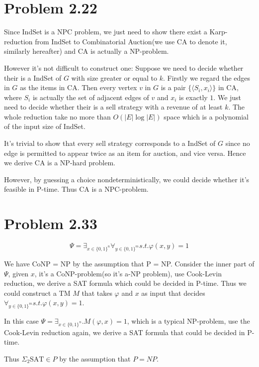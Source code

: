 \documentclass[paper=a4, fontsize=11pt]{scrartcl} %
\numberwithin{equation}{section} %
\numberwithin{figure}{section} %
\numberwithin{table}{section} %
\begin{document}
\section*{Problem 2.22}
Since IndSet is a NPC problem, we just need to show there exist a Karp-reduction from IndSet to Combinatorial Auction(we use CA to denote it, similarly hereafter) and CA is actually a NP-problem.

However it's not difficult to construct one: Suppose we need to decide whether their is a IndSet of $G$ with size greater or equal to $k$. Firstly we regard the edges in $G$ as the items in CA. Then every vertex $v$ in $G$ is a pair $\{\langle S_i, x_i\rangle\}$ in CA, where $S_i$ is actually the set of adjacent edges of $v$ and $x_i$ is exactly $1$. We just need to decide whether their is a sell strategy with a revenue of at least $k$. The whole reduction take no more than $O(|E|\log|E|)$ space which is a polynomial of the input size of IndSet. 

It's trivial to show that every sell strategy corresponds to a IndSet of $G$ since no edge is permitted to appear twice as an item for auction, and vice versa. Hence we derive CA is a NP-hard problem. 

However, by guessing a choice nondeterministically, we could decide whether it's feasible in P-time. Thus CA is a NPC-problem.
\section*{Problem 2.33}
$$\Psi = \exists_{x\in\{0,1\}^n} \forall_{y\in\{0,1\}^m} s.t. \varphi(x, y) = 1$$

We have CoNP = NP by the assumption that P = NP. Consider the inner part of $\Psi$, given $x$, it's a CoNP-problem(so it's a-NP problem), use Cook-Levin reduction, we derive a SAT formula which could be decided in P-time. Thus we could construct a TM $M$ that takes $\varphi$ and $x$ as input that decides $\forall_{y\in\{0,1\}^m} s.t. \varphi(x, y) = 1$. 

In this case $\Psi = \exists_{x\in\{0, 1\}^n}. M(\varphi, x) = 1$, which is a typical NP-problem, use the Cook-Levin reduction again, we derive a SAT formula that could be decided in P-time.

Thus $\Sigma_2\textrm{SAT} \in P$ by the assumption that $P = NP$.
\end{document}
